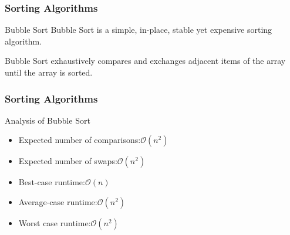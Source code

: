 \documentclass[10pt, compress]{beamer}
\begin{document}
\begin{frame}[fragile]
	\frametitle{Sorting Algorithms}
	\begin{block}{Bubble Sort}
		Bubble Sort is a simple, in-place, stable yet expensive sorting algorithm.

		Bubble Sort exhaustively compares and exchanges adjacent items of the array until the array is sorted.
	\end{block}
\end{frame}

\begin{frame}[fragile]
	\frametitle{Sorting Algorithms}
	\begin{block}{Analysis of Bubble Sort}
		\begin{itemize}
			\item[] Expected number of comparisons:\hfill $\mathcal{O}(n^2)$
			\item[] Expected number of swaps:\hfill $\mathcal{O}(n^2)$
			\item[] Best-case runtime:\hfill $\mathcal{O}(n)$
			\item[] Average-case runtime:\hfill $\mathcal{O}(n^2)$
			\item[] Worst case runtime:\hfill $\mathcal{O}(n^2)$
		\end{itemize}
	\end{block}
\end{frame}

\end{document}
